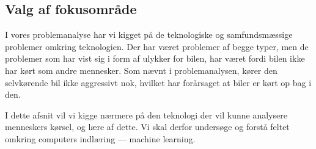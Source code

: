 \subsection{Valg af fokusområde}
I vores problemanalyse har vi kigget på de teknologiske og samfundsmæssige problemer omkring teknologien. Der har været problemer af begge typer, men de problemer som har vist sig i form af ulykker for bilen, har været fordi bilen ikke har kørt som andre mennesker. Som nævnt i problemanalysen, kører den selvkørende bil ikke aggressivt nok, hvilket har forårsaget at biler er kørt op bag i den\cite{VOX}.

I dette afsnit vil vi kigge nærmere på den teknologi der vil kunne analysere menneskers kørsel, og lære af dette. Vi skal derfor undersøge og forstå feltet omkring computers indlæring --- machine learning.